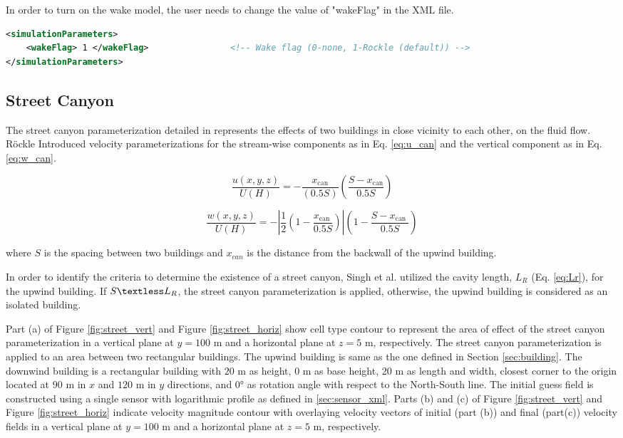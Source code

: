 In order to turn on the wake model, the user needs to change the value of "wakeFlag" in the XML file.

\begin{lstlisting}[language=XML]
<simulationParameters>
  	<wakeFlag> 1 </wakeFlag> 				<!-- Wake flag (0-none, 1-Rockle (default)) -->
</simulationParameters>
\end{lstlisting}

\subsection{Street Canyon}

The street canyon parameterization detailed in \cite{singh2008evaluation} represents the effects of two buildings in close vicinity to each other, on the fluid flow. R\"{o}ckle \cite{rockle1990bestimmung} Introduced velocity parameterizations for the stream-wise components as in Eq. \ref{eq:u_can} and the vertical component as in Eq. \ref{eq:w_can}.

\begin{equation}
\frac{u(x, y, z)}{U(H)}=-\frac{x_{\mathrm{can}}}{(0.5 S)}\left(\frac{S-x_{\mathrm{can}}}{0.5 S}\right)
\label{eq:u_can}
\end{equation}

\begin{equation}
\frac{w(x, y, z)}{U(H)}=-\left|\frac{1}{2}\left(1-\frac{x_{\text {can }}}{0.5 S}\right)\right|\left(1-\frac{S-x_{\text {can }}}{0.5 S}\right)
\label{eq:w_can}
\end{equation}

where $S$ is the spacing between two buildings and $x_{can}$ is the distance from the backwall of the upwind building.

In order to identify the criteria to determine the existence of a street canyon, Singh et al. \cite{singh2008evaluation} utilized the cavity length, $L_R$ (Eq. \ref{eq:Lr}), for the upwind building. If $S \textless L_R$, the street canyon parameterization is applied, otherwise, the upwind building is considered as an isolated building.

Part (a) of Figure \ref{fig:street_vert} and Figure \ref{fig:street_horiz} show cell type contour to represent the area of effect of the street canyon parameterization in a vertical plane at $y=100$ m and a horizontal plane at $z=5$ m, respectively. The street canyon parameterization is applied to an area between two rectangular buildings. The upwind building is same as the one defined in Section \ref{sec:building}. The downwind building is a rectangular building with $20$ m as height, $0$ m as base height, $20$ m as length and width, closest corner to the origin located at $90$ m in $x$ and $120$ m in $y$ directions, and $0\si{\degree}$ as rotation angle with respect to the North-South line. The initial guess field is constructed using a single sensor with logarithmic profile as defined in \ref{sec:sensor_xml}. Parts (b) and (c) of Figure \ref{fig:street_vert} and Figure \ref{fig:street_horiz} indicate velocity magnitude contour with overlaying velocity vectors of initial (part (b)) and final (part(c)) velocity fields in a vertical plane at $y=100$ m and a horizontal plane at $z=5$ m, respectively.


